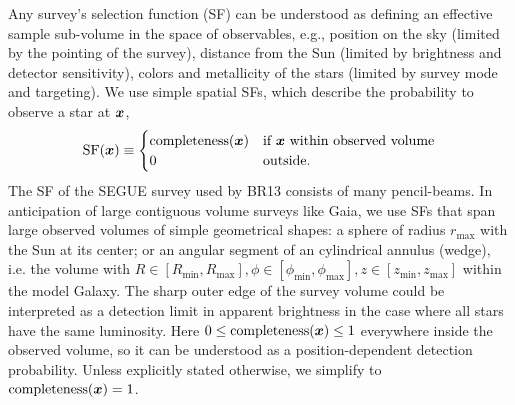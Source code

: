 Any survey's selection function (SF) can be understood as defining an effective sample sub-volume in the space of observables, e.g., position on the sky (limited by the pointing of the survey), distance from the Sun (limited by brightness and detector sensitivity), colors and metallicity of the stars (limited by survey mode and targeting). We use simple spatial SFs, which describe the probability to observe a star at $\boldsymbol{x}$,
\begin{eqnarray*}
\text{SF}(\boldsymbol{x}) \equiv \begin{cases}
\text{completeness}(\boldsymbol{x}) &\text{if $\boldsymbol{x}$ within observed volume}\\
0 & \text{outside.}
\end{cases}
\end{eqnarray*}
The SF of the SEGUE survey \citep{2012ApJ...753..148B} used by BR13 consists of many pencil-beams. In anticipation of large contiguous volume surveys like Gaia, we use SFs that span large observed volumes of simple geometrical shapes: a sphere of radius $r_\text{max}$ with the Sun at its center; or an angular segment of an cylindrical annulus (wedge), i.e. the volume with $R \in [R_\text{min},R_\text{max}],\phi \in [\phi_\text{min},\phi_\text{max}],z \in [z_\text{min},z_\text{max}]$ within the model Galaxy. The sharp outer edge of the survey volume could be interpreted as a detection limit in apparent brightness in the case where all stars have the same luminosity. Here $0 \leq \text{completeness}(\boldsymbol{x}) \leq 1$ everywhere inside the observed volume, so it can be understood as a position-dependent detection probability. Unless explicitly stated otherwise, we simplify to $\text{completeness}(\boldsymbol{x}) = 1$.

